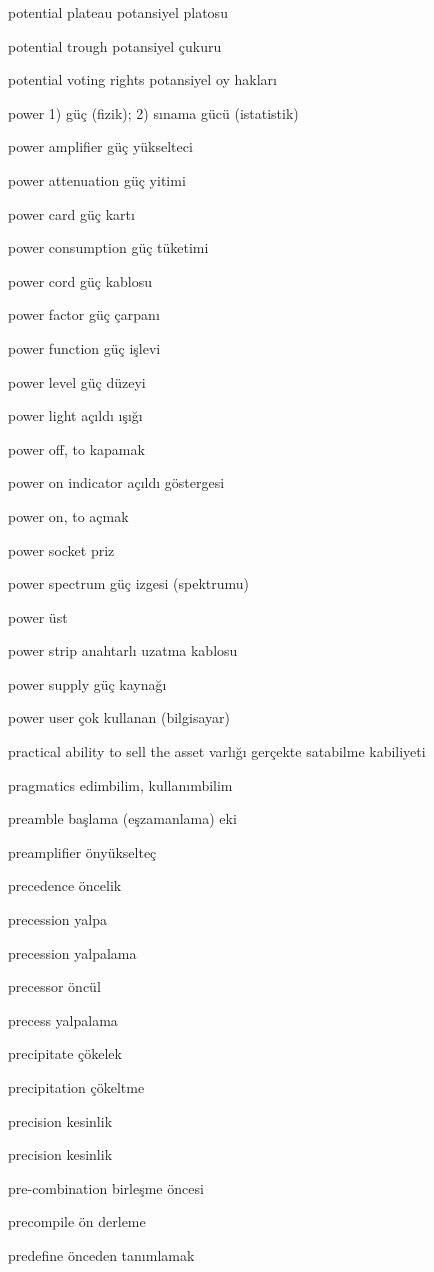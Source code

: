 \documentclass[12pt,fleqn]{article}\usepackage{../../common}
\begin{document}
potential plateau potansiyel platosu

potential trough potansiyel çukuru

potential voting rights potansiyel oy hakları

power 1) güç (fizik); 2) sınama gücü (istatistik)

power amplifier güç yükselteci

power attenuation güç yitimi

power card güç kartı

power consumption güç tüketimi

power cord güç kablosu

power factor güç çarpanı

power function güç işlevi

power level güç düzeyi

power light açıldı ışığı

power off, to kapamak

power on indicator açıldı göstergesi

power on, to açmak

power socket priz

power spectrum güç izgesi (spektrumu)

power üst

power strip anahtarlı uzatma kablosu

power supply güç kaynağı

power user çok kullanan (bilgisayar)

practical ability to sell the asset varlığı gerçekte satabilme kabiliyeti

pragmatics edimbilim, kullanımbilim

preamble başlama (eşzamanlama) eki

preamplifier önyükselteç

precedence öncelik

precession yalpa

precession yalpalama

precessor öncül

precess yalpalama

precipitate çökelek

precipitation çökeltme

precision kesinlik

precision kesinlik

pre-combination birleşme öncesi

precompile ön derleme

predefine önceden tanımlamak
\end{document}
